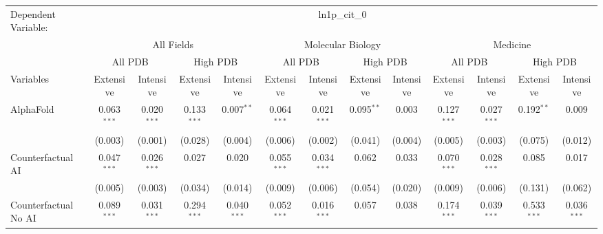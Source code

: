 \begingroup
\centering
\begin{tabular}{lcccccccccccc}
   \tabularnewline \midrule \midrule
   Dependent Variable: & \multicolumn{12}{c}{ln1p\_cit\_0}\\
 & \multicolumn{4}{c}{All Fields} & \multicolumn{4}{c}{Molecular Biology} & \multicolumn{4}{c}{Medicine} \\
\cmidrule(lr){2-5} \cmidrule(lr){6-9} \cmidrule(lr){10-13}
 & \multicolumn{2}{c}{All PDB} & \multicolumn{2}{c}{High PDB} & \multicolumn{2}{c}{All PDB} & \multicolumn{2}{c}{High PDB} & \multicolumn{2}{c}{All PDB} & \multicolumn{2}{c}{High PDB} \\
\cmidrule(lr){2-3} \cmidrule(lr){4-5} \cmidrule(lr){6-7} \cmidrule(lr){8-9} \cmidrule(lr){10-11} \cmidrule(lr){12-13}
Variables & \multicolumn{1}{c}{Extensive} & \multicolumn{1}{c}{Intensive} & \multicolumn{1}{c}{Extensive} & \multicolumn{1}{c}{Intensive} & \multicolumn{1}{c}{Extensive} & \multicolumn{1}{c}{Intensive} & \multicolumn{1}{c}{Extensive} & \multicolumn{1}{c}{Intensive} & \multicolumn{1}{c}{Extensive} & \multicolumn{1}{c}{Intensive} & \multicolumn{1}{c}{Extensive} & \multicolumn{1}{c}{Intensive} \\
\cmidrule(lr){1-1}\cmidrule(lr){2-2} \cmidrule(lr){3-3} \cmidrule(lr){4-4} \cmidrule(lr){5-5} \cmidrule(lr){6-6} \cmidrule(lr){7-7} \cmidrule(lr){8-8} \cmidrule(lr){9-9} \cmidrule(lr){10-10} \cmidrule(lr){11-11} \cmidrule(lr){12-12} \cmidrule(lr){13-13}
   AlphaFold                                & 0.063$^{***}$ & 0.020$^{***}$  & 0.133$^{***}$ & 0.007$^{**}$   & 0.064$^{***}$ & 0.021$^{***}$   & 0.095$^{**}$ & 0.003    & 0.127$^{***}$ & 0.027$^{***}$  & 0.192$^{**}$  & 0.009\\   
                                            & (0.003)       & (0.001)        & (0.028)       & (0.004)        & (0.006)       & (0.002)         & (0.041)      & (0.004)  & (0.005)       & (0.003)        & (0.075)       & (0.012)\\   
   Counterfactual AI                        & 0.047$^{***}$ & 0.026$^{***}$  & 0.027         & 0.020          & 0.055$^{***}$ & 0.034$^{***}$   & 0.062        & 0.033    & 0.070$^{***}$ & 0.028$^{***}$  & 0.085         & 0.017\\   
                                            & (0.005)       & (0.003)        & (0.034)       & (0.014)        & (0.009)       & (0.006)         & (0.054)      & (0.020)  & (0.009)       & (0.006)        & (0.131)       & (0.062)\\   
   Counterfactual No AI                     & 0.089$^{***}$ & 0.031$^{***}$  & 0.294$^{***}$ & 0.040$^{***}$  & 0.052$^{***}$ & 0.016$^{***}$   & 0.057        & 0.038    & 0.174$^{***}$ & 0.039$^{***}$  & 0.533$^{***}$ & 0.036$^{***}$\\   

\end{tabular}
